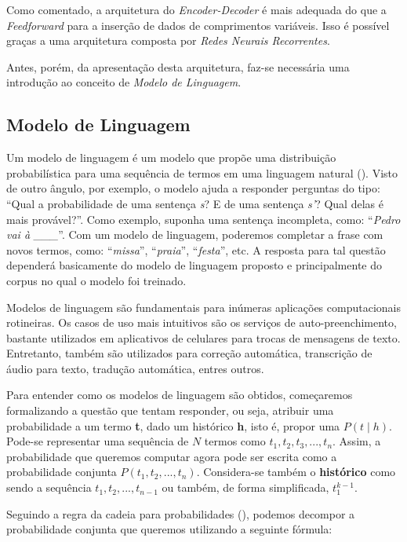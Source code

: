 Como comentado, a arquitetura do \textit{Encoder-Decoder} é mais adequada do que a \textit{Feedforward} para a inserção de dados de comprimentos variáveis. Isso é possível graças a uma arquitetura composta por \textit{Redes Neurais Recorrentes}.

Antes, porém, da apresentação desta arquitetura, faz-se necessária uma introdução ao conceito de \textit{Modelo de Linguagem}.

\subsection{Modelo de Linguagem}

Um modelo de linguagem é um modelo que propõe uma distribuição probabilística para uma sequência de termos em uma linguagem natural (\cite{Manning:1999}). Visto de outro ângulo, por exemplo, o modelo ajuda a responder perguntas do tipo: “Qual a probabilidade de uma sentença \textit{s}? E de uma sentença \textit{s'}? Qual delas é mais provável?”.
 Como exemplo, suponha uma sentença incompleta, como: “\textit{Pedro vai à \_\_\_}”. Com um modelo de linguagem, poderemos completar a frase com novos termos, como: “\textit{missa}”, “\textit{praia}”, “\textit{festa}”, etc. A resposta para tal questão dependerá basicamente do modelo de linguagem proposto e principalmente do corpus no qual o modelo foi treinado. 

Modelos de linguagem são fundamentais para inúmeras aplicações computacionais rotineiras. Os casos de uso mais intuitivos são os serviços de auto-preenchimento, bastante utilizados em aplicativos de celulares para trocas de mensagens de texto. Entretanto, também são utilizados para correção automática, transcrição de áudio para texto,  tradução automática, entres outros.  

Para entender como os modelos de linguagem são obtidos, começaremos formalizando a questão que tentam responder, ou seja, atribuir uma probabilidade a um termo \textbf{t}, dado um histórico \textbf{h}, isto é, propor uma $P(t \mid h)$. Pode-se representar uma sequência de $N$ termos como $t_1, t_2, t_3, ..., t_n$. Assim, a probabilidade que queremos computar agora pode ser escrita como a probabilidade conjunta $P(t_1, t_2, ..., t_n)$. Considera-se também o \textbf{histórico} como sendo a sequência $t_1, t_2, ..., t_{n-1}$ ou também, de forma simplificada, $t_{1}^{k-1}$. 

Seguindo a regra da cadeia para probabilidades (\cite{Jurafsky:2009:SLP:1214993}), podemos decompor a probabilidade conjunta que queremos utilizando a seguinte fórmula:

